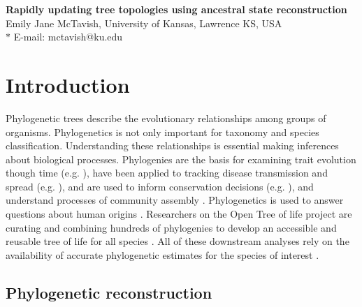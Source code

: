 \documentclass[10pt]{article}
\date{}
\begin{document}
\begin{flushleft}
{\Large
\textbf{Rapidly updating tree topologies using ancestral state reconstruction}
}
\\
Emily Jane McTavish, University of Kansas, Lawrence KS, USA
\\

$\ast$ E-mail: mctavish@ku.edu
\end{flushleft}


\section*{Introduction}
Phylogenetic trees describe the evolutionary relationships among groups of organisms. 
Phylogenetics is not only important for taxonomy and species classification. 
Understanding these relationships is essential making inferences about biological processes. 
Phylogenies are the basis for examining trait evolution though time (e.g. 
\cite{omeara_testing_2006}), have been applied to tracking disease transmission and spread (e.g. 
\cite{timme_phylogenetic_2013}), and are used to inform conservation decisions (e.g. 
\cite{isaac_mammals_2007}), and understand processes of community assembly \cite{emerson_phylogenetic_2008}. 
Phylogenetics is used to answer questions about human origins \cite{endicott_using_2010}. 
Researchers on the Open Tree of life project are curating and combining hundreds of phylogenies to develop an accessible and reusable tree of life for all species \cite{drew_lost_2013}. 
All of these downstream analyses rely on the availability of accurate phylogenetic estimates for the species of interest \cite{stoltzfus_phylotastic!_2013}.


\subsection*{Phylogenetic reconstruction}
\end{document}
